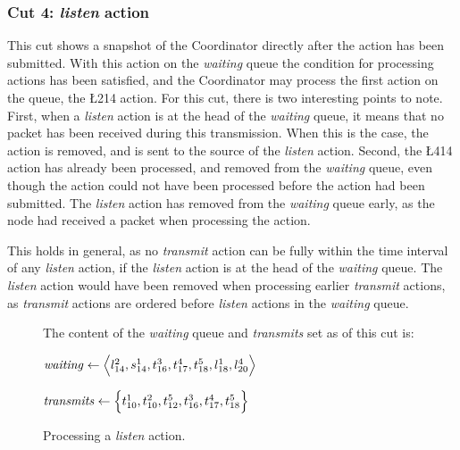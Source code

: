 \subsubsection{Cut 4: \textit{listen} action}
This cut shows a snapshot of the Coordinator directly after the  action has been submitted. With this
action on the \textit{waiting} queue the condition for processing actions has been satisfied, and the
Coordinator may process the first action on the queue, the \L{2}{14} action. For this cut, there is two
interesting points to note. First, when a \textit{listen} action is at the head of the \textit{waiting} queue,
it means that no packet has been received during this transmission. When this is the case, the action is
removed, and \KwNull is sent to the source of the \textit{listen} action. Second, the \L{4}{14} action has
already been processed, and removed from the \textit{waiting} queue, even though the action could not have
been processed before the  action had been submitted. The \textit{listen} action has removed from the
\textit{waiting} queue early, as the node had received a packet when processing the  action.
\medbreak

This holds in general, as no \textit{transmit} action can be fully within the time interval of any
\textit{listen} action, if the \textit{listen} action is at the head of the \textit{waiting} queue. The
\textit{listen} action would have been removed when processing earlier \textit{transmit} actions, as
\textit{transmit} actions are ordered before \textit{listen} actions in the \textit{waiting} queue.

\begin{figure}[H]
    \caption{Processing a \textit{listen} action.}\label{tikz:coordinatormsc4}
     \par

    \begin{minipage}[h]{14.5cm}
        The content of the \textit{waiting} queue and \textit{transmits} set as of this cut is: \smallbreak

        $\mathit{waiting} \leftarrow \Big\langle l^{2}_{14}, s^{1}_{14}, t^{3}_{16}, t^{4}_{17}, t^{5}_{18},
            l^{1}_{18}, l^{4}_{20} \Big\rangle$

        $\mathit{transmits} \leftarrow \Big\{ t^{1}_{10}, t^{2}_{10}, t^{5}_{12}, t^{3}_{16}, t^{4}_{17}, t^{5}_{18}
            \Big\}$
    \end{minipage}
\end{figure}

